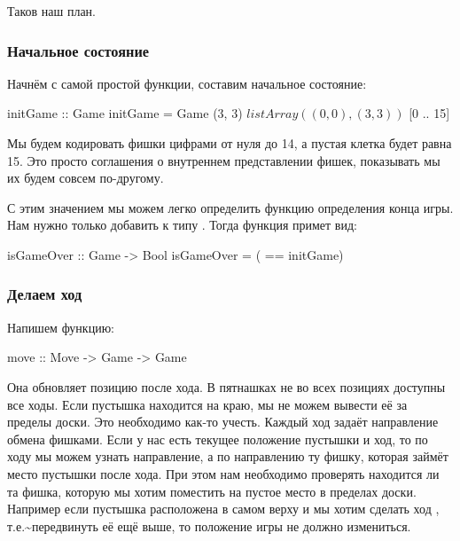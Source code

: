 Таков наш план.

\subsubsection{Начальное состояние}

Начнём с самой простой функции, составим начальное состояние:


\begin{code}
initGame :: Game
initGame = Game (3, 3) $ listArray ((0, 0), (3, 3)) $ [0 .. 15]
\end{code}

Мы будем кодировать фишки цифрами от нуля до 14, а пустая клетка будет
равна 15. Это просто соглашения о внутреннем представлении фишек,
показывать мы их будем совсем по-другому.

С этим значением мы можем легко определить функцию определения конца
игры. Нам нужно только добавить  к типу .
Тогда функция  примет вид:


\begin{code}
isGameOver :: Game -> Bool
isGameOver = ( == initGame)
\end{code}

\subsubsection{Делаем ход}

Напишем функцию:


\begin{code}
move :: Move -> Game -> Game
\end{code}

Она обновляет позицию после хода. В пятнашках не во всех позициях
доступны все ходы. Если пустышка находится на краю, мы не можем вывести
её за пределы доски. Это необходимо как-то учесть. Каждый ход задаёт
направление обмена фишками. Если у нас есть текущее положение пустышки и
ход, то по ходу мы можем узнать направление, а по направлению ту фишку,
которая займёт место пустышки после хода. При этом нам необходимо
проверять находится ли та фишка, которую мы хотим поместить на пустое
место в пределах доски. Например если пустышка расположена в самом верху
и мы хотим сделать ход , т.е.\textasciitilde{}передвинуть её ещё
выше, то положение игры не должно измениться.


